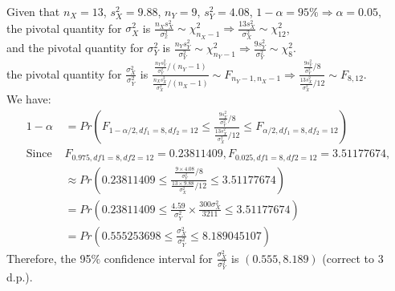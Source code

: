 \documentclass{article}
\begin{document}
Given that $n_X = 13$, $s_X^2 = 9.88$, $n_Y = 9$, $s_Y^2 = 4.08$, $1-\alpha=95\% \Rightarrow \alpha = 0.05$, \\
the pivotal quantity for $\sigma_X^2$ is $\frac{n_{X} s_{X}^2}{\sigma_x^2} \sim \chi_{n_X - 1}^2 \Rightarrow \frac{13 s_X^2}{\sigma_X^2} \sim \chi_{12}^2$, \\
and the pivotal quantity for $\sigma_Y^2$ is $\frac{n_{Y} s_{Y}^2}{\sigma_Y^2} \sim \chi_{n_Y - 1}^2 \Rightarrow \frac{9 s_Y^2}{\sigma_Y^2} \sim \chi_{8}^2$. \\
the pivotal quantity for $\frac{\sigma_X^2}{\sigma_Y^2}$ is $\frac{\frac{n_{Y} s_{Y}^2}{\sigma_Y^2}/(n_Y - 1)}{\frac{n_{X} s_{X}^2}{\sigma_X^2}/(n_X - 1)} \sim F_{n_Y - 1, n_X - 1} \Rightarrow \frac{\frac{9 s_Y^2}{\sigma_Y^2}/8}{\frac{13 s_X^2}{\sigma_X^2}/12} \sim F_{8, 12}$. \\
We have:
\begin{align*}
1 - \alpha &= Pr(F_{1-\alpha/2, df_1=8, df_2=12} \leq \frac{\frac{9 s_Y^2}{\sigma_Y^2}/8}{\frac{13 s_X^2}{\sigma_X^2}/12} \leq F_{\alpha/2, df_1=8, df_2=12}) \\
\text{Since } & F_{0.975, df1=8, df2=12} = 0.23811409, F_{0.025, df1=8, df2=12} = 3.51177674, \\
&\approx Pr(0.23811409 \leq \frac{\frac{9 \times 4.08}{\sigma_Y^2}/8}{\frac{13 \times 9.88}{\sigma_X^2}/12} \leq 3.51177674) \\
&= Pr(0.23811409 \leq \frac{4.59}{\sigma_Y^2} \times \frac{300\sigma_X^2}{3211} \leq 3.51177674) \\
&= Pr(0.555253698 \leq \frac{\sigma_X^2}{\sigma_Y^2} \leq 8.189045107)
\end{align*}
Therefore, the 95$\%$ confidence interval for $\frac{\sigma_X^2}{\sigma_Y^2}$ is $(0.555, 8.189)$ (correct to 3 d.p.).
\end{document}
